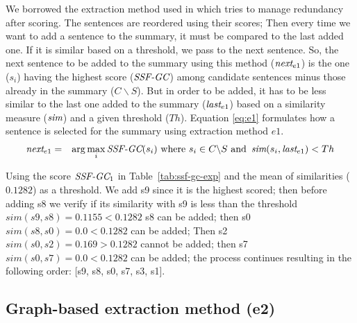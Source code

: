 We borrowed the extraction method used in \citep{15-aries-al} which tries to manage redundancy after scoring.
The sentences are reordered using their scores; Then every time we want to add a sentence to the summary, it must be compared to the last added one.
If it is similar based on a threshold, we pass to the next sentence.
So, the next sentence to be added to the summary using this method ($\operatorname{\textit{next}}_{e1}$) is the one ($s_i$) having the highest score ($ \operatorname{\textit{SSF-GC}} $) among candidate sentences minus those already in the summary ($ C\backslash S $).
But in order to be added, it has to be less similar to the last one added to the summary ($\operatorname{\textit{last}}_{e1}$) based on a similarity measure ($\operatorname{\textit{sim}}$) and a given threshold ($Th$).
Equation \ref{eq:e1} formulates how a sentence is selected for the summary using extraction method $e1$.
\begin{equation}
	\begin{aligned}
		\operatorname{\textit{next}}_{e1} & = & \arg\max\limits_i \operatorname{\textit{SSF-GC}}(s_i)
		\text{ where } s_i \in C\backslash S \text{ and } \operatorname{\textit{sim}}(s_i, \operatorname{\textit{last}}_{e1}) < Th\\
	\end{aligned}
	\label{eq:e1}
\end{equation}

Using the score $ \operatorname{\textit{SSF-GC}}_1 $ in Table~\ref{tab:ssf-gc-exp} and the mean of similarities ($ 0.1282 $) as a threshold. 
We add s9 since it is the highest scored; then before adding s8 we verify if its similarity with s9 is less than the threshold $ sim(s9, s8) = 0.1155 < 0.1282 $ s8 can be added; then s0 $ sim(s8, s0) = 0.0 < 0.1282$ can be added; Then s2 $ sim(s0, s2) = 0.169 > 0.1282 $ cannot be added; then s7 $ sim(s0, s7) = 0.0 < 0.1282$ can be added; the process continues resulting in the following order: [s9, s8, s0, s7, s3, s1].

\subsection{Graph-based extraction method (e2)}

